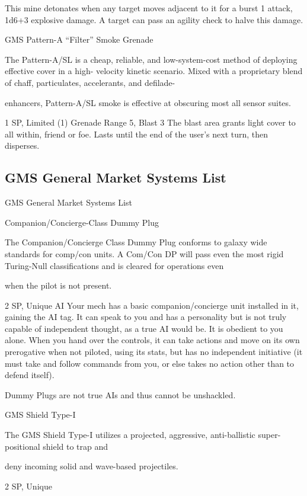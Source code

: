 This mine detonates when any target moves adjacent to it for a burst 1 attack, 1d6+3 explosive  
damage. A target can pass an agility check to halve this damage.
 

GMS Pattern-A “Filter” Smoke Grenade  

The Pattern-A/SL is a cheap, reliable, and low-system-cost method of deploying effective cover in a high- 
velocity kinetic scenario. Mixed with a proprietary blend of chaff, particulates, accelerants, and defilade- 

enhancers, Pattern-A/SL smoke is effective at obscuring most all sensor suites.   

1 SP, Limited (1)  
Grenade  
Range 5, Blast 3  
The blast area grants light cover to all within, friend or foe. Lasts until the end of the user’s next  
turn, then disperses.
 
\subsection{GMS General Market Systems List}
                                GMS General Market Systems List  

Companion/Concierge-Class Dummy Plug  

The Companion/Concierge Class Dummy Plug conforms to galaxy wide standards for comp/con units. A  
Com/Con DP will pass even the most rigid Turing-Null classifications and is cleared for operations even  

when the pilot is not present.   

2 SP, Unique  
AI  
Your mech has a basic companion/concierge unit installed in it, gaining the AI tag. It can speak  
to you and has a personality but is not truly capable of independent thought, as a true AI would  
be. It is obedient to you alone. When you hand over the controls, it can take actions and move  
on its own prerogative when not piloted, using its stats, but has no independent initiative (it must  
take and follow commands from you, or else takes no action other than to defend itself).
 

Dummy Plugs are not true AIs and thus cannot be unshackled.
 

GMS Shield Type-I  

The GMS Shield Type-I utilizes a projected, aggressive, anti-ballistic super-positional shield to trap and  

deny incoming solid and wave-based projectiles.   
   

2 SP, Unique
 
